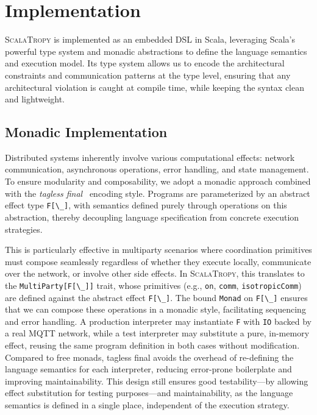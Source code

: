 \documentclass[runningheads]{llncs}
\newcommand{\ourLang}{\textsc{ScalaTropy}}
\newcommand{\code}[1]{\lstinline[style=scala3,basicstyle=\ttfamily\small\color{vscLightText}]{#1}}
\begin{document}
\section{Implementation}\label{sec:implementation}
\ourLang{} is implemented as an embedded DSL in Scala,
leveraging Scala's powerful type system and monadic abstractions to define the language semantics and execution model.
%
Its type system allows us to encode the architectural constraints and communication patterns at the type level,
ensuring that any architectural violation is caught at compile time,
while keeping the syntax clean and lightweight.

\subsection{Monadic Implementation}
Distributed systems inherently involve various computational effects:
network communication, asynchronous operations, error handling, and state management.
%
To ensure modularity and composability,
we adopt a monadic approach combined with the \emph{tagless final}~\cite{DBLP:journals/jfp/CaretteKS09} encoding style. %
Programs are parameterized by an abstract effect type \code{F[\_]},
with semantics defined purely through operations on this abstraction,
thereby decoupling language specification from concrete execution strategies.

This is particularly effective in multiparty scenarios where coordination primitives must compose seamlessly
regardless of whether they execute locally, communicate over the network, 
or involve other side effects.
%
In \ourLang{}, this translates to the \code{MultiParty[F[\_]]} trait,
whose primitives (e.g., \code{on}, \code{comm}, \code{isotropicComm}) are defined against the abstract effect \code{F[\_]}.
The bound \code{Monad} on \code{F[\_]} ensures that we can compose these operations in a monadic style, facilitating sequencing and error handling.
%
A production interpreter may instantiate \code{F} with \code{IO} backed by a real MQTT network,
while a test interpreter may substitute a pure, in-memory effect,
reusing the same program definition in both cases without modification.
%
Compared to free monads,
tagless final avoids the overhead of %
re-defining the language semantics for each interpreter,
reducing error-prone boilerplate and improving maintainability.
%
This design still ensures good testability---by allowing effect substitution for testing purposes---and
maintainability, as the language semantics is defined in a single place, independent of the execution strategy.
\end{document}
